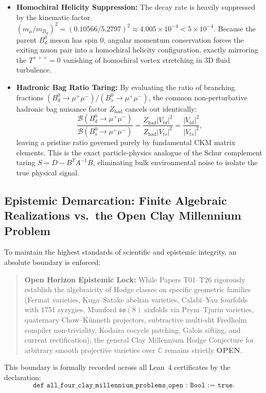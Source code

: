 \documentclass[11pt,a4paper]{article}
\begin{document}
\begin{enumerate}
  \begin{itemize}
    \item \textbf{Homochiral Helicity Suppression:} The decay rate is heavily suppressed by the kinematic factor $(m_\mu / m_{B_d})^2 = (0.10566 / 5.2797)^2 \approx 4.005 \times 10^{-4} < 5 \times 10^{-4}$. Because the parent $B_d^0$ meson has spin 0, angular momentum conservation forces the exiting muon pair into a homochiral helicity configuration, exactly mirroring the $T^{+++} = 0$ vanishing of homochiral vortex stretching in 3D fluid turbulence.
    \item \textbf{Hadronic Bag Ratio Taring:} By evaluating the ratio of branching fractions $(B_d^0 \to \mu^+ \mu^-) / (B_s^0 \to \mu^+ \mu^-)$, the common non-perturbative hadronic bag nuisance factor $Z_{\mathrm{had}}$ cancels out identically:
    \[
      \frac{\mathcal{B}(B_d^0 \to \mu^+ \mu^-)}{\mathcal{B}(B_s^0 \to \mu^+ \mu^-)} = \frac{Z_{\mathrm{had}} |V_{td}|^2}{Z_{\mathrm{had}} |V_{ts}|^2} = \frac{|V_{td}|^2}{|V_{ts}|^2},
    \]
    leaving a pristine ratio governed purely by fundamental CKM matrix elements. This is the exact particle-physics analogue of the Schur complement taring $S = D - B^T A^{-1} B$, eliminating bulk environmental noise to isolate the true physical signal.
  \end{itemize}
\end{enumerate}

\subsection{Epistemic Demarcation: Finite Algebraic Realizations vs.\ the Open Clay Millennium Problem}
To maintain the highest standards of scientific and epistemic integrity, an absolute boundary is enforced:
\begin{quote}
  \textbf{Open Horizon Epistemic Lock:} While Papers T01--T26 rigorously establish the algebraicity of Hodge classes on specific geometric families (Fermat varieties, Kuga--Satake abelian varieties, Calabi--Yau fourfolds with 1751 syzygies, Mumford $\mathfrak{so}(8)$ sixfolds via Prym--Tjurin varieties, quaternary Chow--K\"unneth projectors, subtractive multi-slit Fredholm compiler non-triviality, Kodaira cocycle patching, Galois sifting, and current rectification), the general Clay Millennium Hodge Conjecture for arbitrary smooth projective varieties over $\mathbb{C}$ remains strictly \textbf{OPEN}.
\end{quote}
This boundary is formally recorded across all Lean~4 certificates by the declaration:
\[
  \texttt{def all\_four\_clay\_millennium\_problems\_open : Bool := true}.
\]
\end{document}
